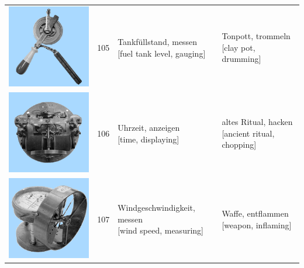 \documentclass[
  english,
  doc,12pt,twoside,floatsintext]{apa7}
\begin{document}
\begin{center}
\begin{ThreePartTable}
{\begin{longtable}{llll}
\includegraphics[valign=c, scale=0.23]{../materials/unfamiliar/105.png} & 105 & \makecell[l]{Tankfüllstand, messen\\{[fuel tank level, gauging]}} & \makecell[l]{Tonpott, trommeln\\{[clay pot, drumming]}}\\
\includegraphics[valign=c, scale=0.23]{../materials/unfamiliar/106.png} & 106 & \makecell[l]{Uhrzeit, anzeigen\\{[time, displaying]}} & \makecell[l]{altes Ritual, hacken\\{[ancient ritual, chopping]}}\\
\includegraphics[valign=c, scale=0.23]{../materials/unfamiliar/107.png} & 107 & \makecell[l]{Windgeschwindigkeit, messen\\{[wind speed, measuring]}} & \makecell[l]{Waffe, entflammen\\{[weapon, inflaming]}}\\

\end{longtable}}
\end{ThreePartTable}
\end{center}
\end{document}
